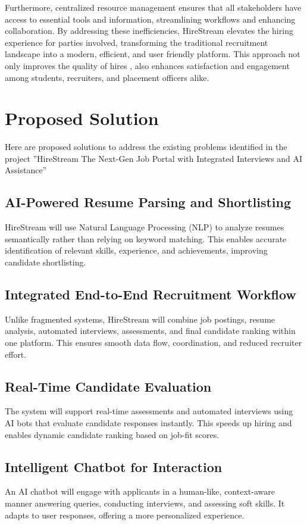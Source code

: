 \documentclass[a4paper, 12pt]{report}
\begin{document}
Furthermore, centralized resource management ensures that all stakeholders have access to essential tools and information, streamlining workflows and enhancing collaboration. By addressing these inefficiencies, HireStream elevates the hiring experience for  parties involved, transforming the traditional recruitment landscape into a modern, efficient, and user friendly platform. This  approach not only improves the quality of hires , also enhances  satisfaction and engagement among students, recruiters, and placement officers alike.

\section{Proposed Solution}


Here are proposed solutions to address the existing problems identified in the project ”HireStream The Next-Gen Job Portal with Integrated Interviews and AI Assistance”
\subsection{AI-Powered Resume Parsing and Shortlisting}
HireStream will use Natural Language Processing (NLP) to analyze resumes semantically rather than relying on keyword matching. This enables accurate identification of relevant skills, experience, and achievements, improving candidate shortlisting.

\subsection{Integrated End-to-End Recruitment Workflow}
Unlike fragmented systems, HireStream will combine job postings, resume analysis, automated interviews, assessments, and final candidate ranking within one platform. This ensures smooth data flow, coordination, and reduced recruiter effort.

\subsection{Real-Time Candidate Evaluation}
The system will support real-time assessments and automated interviews using AI bots that evaluate candidate responses instantly. This speeds up hiring and enables dynamic candidate ranking based on job-fit scores.

\subsection{Intelligent Chatbot for Interaction}
An AI chatbot will engage with applicants in a human-like, context-aware manner answering queries, conducting interviews, and assessing soft skills. It adapts to user responses, offering a more personalized experience.
\end{document}

